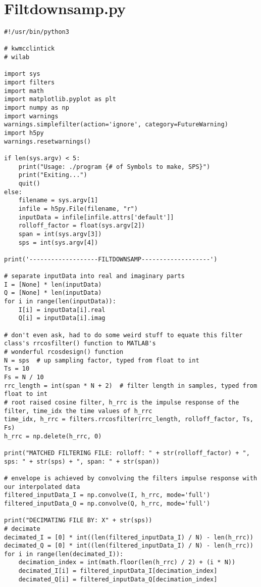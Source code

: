 \section{Filtdownsamp.py}
\begin{lstlisting}[breaklines]
#!/usr/bin/python3

# kwmcclintick
# wilab

import sys
import filters
import math
import matplotlib.pyplot as plt
import numpy as np
import warnings
warnings.simplefilter(action='ignore', category=FutureWarning)
import h5py
warnings.resetwarnings()

if len(sys.argv) < 5:
	print("Usage: ./program {# of Symbols to make, SPS}")
	print("Exiting...")
	quit()
else:
	filename = sys.argv[1]
	infile = h5py.File(filename, "r")
	inputData = infile[infile.attrs['default']]
	rolloff_factor = float(sys.argv[2])
	span = int(sys.argv[3])
	sps = int(sys.argv[4])

print('-------------------FILTDOWNSAMP-------------------')

# separate inputData into real and imaginary parts
I = [None] * len(inputData)
Q = [None] * len(inputData)
for i in range(len(inputData)):
	I[i] = inputData[i].real
	Q[i] = inputData[i].imag

# don't even ask, had to do some weird stuff to equate this filter class's rrcosfilter() function to MATLAB's
# wonderful rcosdesign() function
N = sps  # up sampling factor, typed from float to int
Ts = 10
Fs = N / 10
rrc_length = int(span * N + 2)  # filter length in samples, typed from float to int
# root raised cosine filter, h_rrc is the impulse response of the filter, time_idx the time values of h_rrc
time_idx, h_rrc = filters.rrcosfilter(rrc_length, rolloff_factor, Ts, Fs)
h_rrc = np.delete(h_rrc, 0)

print("MATCHED FILTERING FILE: rolloff: " + str(rolloff_factor) + ", sps: " + str(sps) + ", span: " + str(span))

# envelope is achieved by convolving the filters impulse response with our interpolated data
filtered_inputData_I = np.convolve(I, h_rrc, mode='full')
filtered_inputData_Q = np.convolve(Q, h_rrc, mode='full')

print("DECIMATING FILE BY: X" + str(sps))
# decimate
decimated_I = [0] * int((len(filtered_inputData_I) / N) - len(h_rrc))
decimated_Q = [0] * int((len(filtered_inputData_I) / N) - len(h_rrc))
for i in range(len(decimated_I)):
	decimation_index = int(math.floor(len(h_rrc) / 2) + (i * N))
	decimated_I[i] = filtered_inputData_I[decimation_index]
	decimated_Q[i] = filtered_inputData_Q[decimation_index]


\end{lstlisting}
